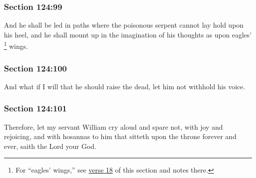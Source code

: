 	\subsubsection{Section 124:99} %
		\label{DC124-99}

		And he shall be led in paths where the poisonous serpent cannot lay hold upon his heel, and he shall mount up in the imagination of his thoughts as upon eagles'%
			\footnote{%
				For ``eagles' wings,'' see \hyperref[DC124-18]{verse 18} of this section and notes there.
				}
		wings.


	\subsubsection{Section 124:100} %
		\label{DC124-100}

		And what if I will that he should raise the dead, let him not withhold his voice.


	\subsubsection{Section 124:101} %
		\label{DC124-101}

		Therefore, let my servant William cry aloud and spare not, with joy and rejoicing, and with hosannas to him that sitteth upon the throne forever and ever, saith the Lord your God.


